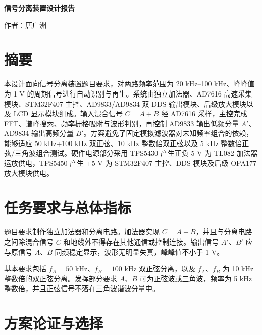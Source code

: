 \documentclass[UTF8,a4paper,zihao=-4]{ctexart}
\begin{document}
\begin{titlepage}
\thispagestyle{empty}
\centering
\vspace*{2.2cm}
{\bfseries 信号分离装置设计报告\par}
\vspace{0.8cm}
{ 作者：唐广洲\par}
\vfill
\end{titlepage}

\clearpage
\thispagestyle{plain}
\section*{摘要}
\noindent
本设计面向信号分离装置题目要求，对两路频率范围为 20 kHz--100 kHz、峰峰值为 1 V 的周期信号进行自动识别与再生。系统由独立加法器、AD7616 高速采集模块、STM32F407 主控、AD9833/AD9834 双 DDS 输出模块、后级放大模块以及 LCD 显示模块组成。输入混合信号 $C=A+B$ 经 AD7616 采样，主控完成 FFT、谱峰搜索、频率栅格吸附与波形判别，再控制 AD9833 输出低频分量 $A'$、AD9834 输出高频分量 $B'$。方案避免了固定模拟滤波器对未知频率组合的依赖，能够适应 50 kHz+100 kHz 双正弦、10 kHz 整数倍双正弦以及 5 kHz 整数倍正弦/三角波组合测试。硬件电源部分采用 TPS5430 产生正负 5 V 为 TL082 加法器运放供电，TPS5450 产生 +5 V 为 STM32F407 主控、DDS 模块及后级 OPA177 放大模块供电。
\clearpage

\setcounter{page}{1}
\let\originsection\section
\renewcommand{\section}{\clearpage\originsection}

\section{任务要求与总体指标}

题目要求制作独立加法器和分离电路。加法器实现 $C=A+B$，并且与分离电路之间除混合信号 $C$ 和地线外不得存在其他通信或控制连接。输出信号 $A'$、$B'$ 应与原信号 $A$、$B$ 同频稳定显示，波形无明显失真，峰峰值不小于 1 V。

基本要求包括 $f_A=50\text{ kHz}$、$f_B=100\text{ kHz}$ 双正弦分离，以及 $f_A$、$f_B$ 为 10 kHz 整数倍的双正弦分离。发挥部分要求 $A$、$B$ 可为正弦波或三角波，频率为 5 kHz 整数倍，并且正弦信号不落在三角波谐波分量中。

\section{方案论证与选择}
\end{document}
